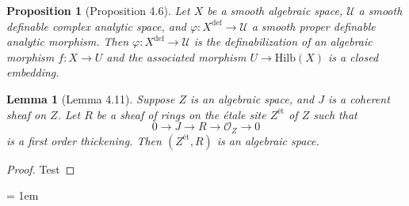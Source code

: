 \documentclass{amsart}
\newtheorem{lemma}[theorem]{Lemma}
\newtheorem{proposition}[theorem]{Proposition}
\theoremstyle{definition}
\numberwithin{equation}{section}
\newcommand{\definable}{\mathrm{def}}
\begin{document}
\begin{proposition}[Proposition 4.6]
  Let $X$ be a smooth algebraic space,
  $\mathcal{U}$ a smooth definable complex analytic space,
  and $\varphi: X^{\definable} \to \mathcal{U}$ a smooth proper definable analytic morphism.
  Then $\varphi: X^{\definable} \to \mathcal{U}$ is the definabilization of an algebraic morphism $f: X \to U$ and
  the associated morphism $U \to \mathrm{Hilb}(X)$ is a closed embedding.
\end{proposition}

\begin{lemma}[Lemma 4.11]
  Suppose $Z$ is an algebraic space,
  and $J$ is a coherent sheaf on $Z$.
  Let $R$ be a sheaf of rings on the {\'e}tale site $Z^{\text{\' et}}$ of $Z$ such that
  \[
    0 \to J \to R \to \mathcal{O}_Z \to 0
  \]
  is a first order thickening.
  Then $(Z^{\text{\'et}},R)$ is an algebraic space.
\end{lemma}

\begin{proof}
Test
\end{proof}

\emergencystretch = 1em
\printbibliography
\end{document}
